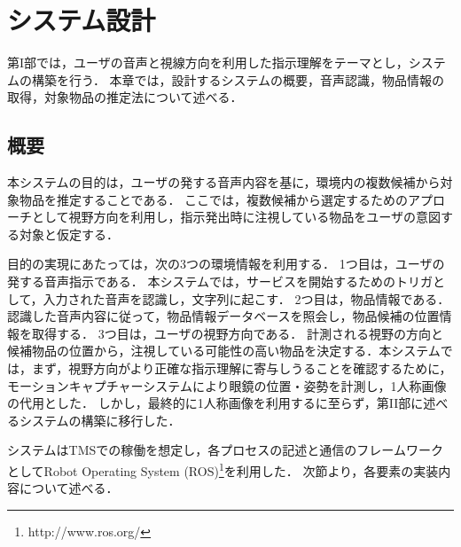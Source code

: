 \chapter{システム設計}
第I部では，ユーザの音声と視線方向を利用した指示理解をテーマとし，システムの構築を行う．
本章では，設計するシステムの概要，音声認識，物品情報の取得，対象物品の推定法について述べる．

\section{概要}
本システムの目的は，ユーザの発する音声内容を基に，環境内の複数候補から対象物品を推定することである．
ここでは，複数候補から選定するためのアプローチとして視野方向を利用し，指示発出時に注視している物品をユーザの意図する対象と仮定する．

目的の実現にあたっては，次の3つの環境情報を利用する．
1つ目は，ユーザの発する音声指示である．
本システムでは，サービスを開始するためのトリガとして，入力された音声を認識し，文字列に起こす．
2つ目は，物品情報である．
認識した音声内容に従って，物品情報データベースを照会し，物品候補の位置情報を取得する．
3つ目は，ユーザの視野方向である．
計測される視野の方向と候補物品の位置から，注視している可能性の高い物品を決定する．本システムでは，まず，視野方向がより正確な指示理解に寄与しうることを確認するために，モーションキャプチャーシステムにより眼鏡の位置・姿勢を計測し，1人称画像の代用とした．
しかし，最終的に1人称画像を利用するに至らず，第II部に述べるシステムの構築に移行した．

システムはTMSでの稼働を想定し，各プロセスの記述と通信のフレームワークとしてRobot Operating System (ROS)\footnote{http://www.ros.org/}を利用した．
次節より，各要素の実装内容について述べる．

